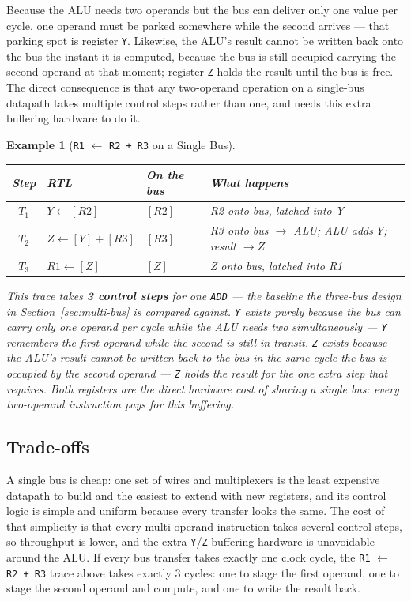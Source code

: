 \documentclass[11pt]{article}
\newtheorem{example}{Example}[section]
\begin{document}
Because the ALU needs two operands but the bus can deliver only one value per cycle, one operand must be parked somewhere while the second arrives --- that parking spot is register \texttt{Y}. Likewise, the ALU's result cannot be written back onto the bus the instant it is computed, because the bus is still occupied carrying the second operand at that moment; register \texttt{Z} holds the result until the bus is free. The direct consequence is that any two-operand operation on a single-bus datapath takes multiple control steps rather than one, and needs this extra buffering hardware to do it.

\begin{example}[\texttt{R1} $\gets$ \texttt{R2 + R3} on a Single Bus]
\begin{center}
\small
\begin{tabular}{@{}clll@{}}
\toprule
\textbf{Step} & \textbf{RTL} & \textbf{On the bus} & \textbf{What happens} \\
\midrule
$T_1$ & $Y \gets [R2]$ & $[R2]$ & R2 onto bus, latched into Y \\
$T_2$ & $Z \gets [Y] + [R3]$ & $[R3]$ & R3 onto bus $\to$ ALU; ALU adds $Y$; result $\to Z$ \\
$T_3$ & $R1 \gets [Z]$ & $[Z]$ & Z onto bus, latched into R1 \\
\bottomrule
\end{tabular}
\end{center}
This trace takes \textbf{3 control steps} for one \texttt{ADD} --- the baseline the three-bus design in Section~\ref{sec:multi-bus} is compared against. \texttt{Y} exists purely because the bus can carry only one operand per cycle while the ALU needs two simultaneously --- \texttt{Y} remembers the first operand while the second is still in transit. \texttt{Z} exists because the ALU's result cannot be written back to the bus in the same cycle the bus is occupied by the second operand --- \texttt{Z} holds the result for the one extra step that requires. Both registers are the direct hardware cost of sharing a single bus: every two-operand instruction pays for this buffering.
\end{example}

\subsection{Trade-offs}

A single bus is cheap: one set of wires and multiplexers is the least expensive datapath to build and the easiest to extend with new registers, and its control logic is simple and uniform because every transfer looks the same. The cost of that simplicity is that every multi-operand instruction takes several control steps, so throughput is lower, and the extra \texttt{Y}/\texttt{Z} buffering hardware is unavoidable around the ALU. If every bus transfer takes exactly one clock cycle, the \texttt{R1} $\gets$ \texttt{R2 + R3} trace above takes exactly 3 cycles: one to stage the first operand, one to stage the second operand and compute, and one to write the result back.
\end{document}
